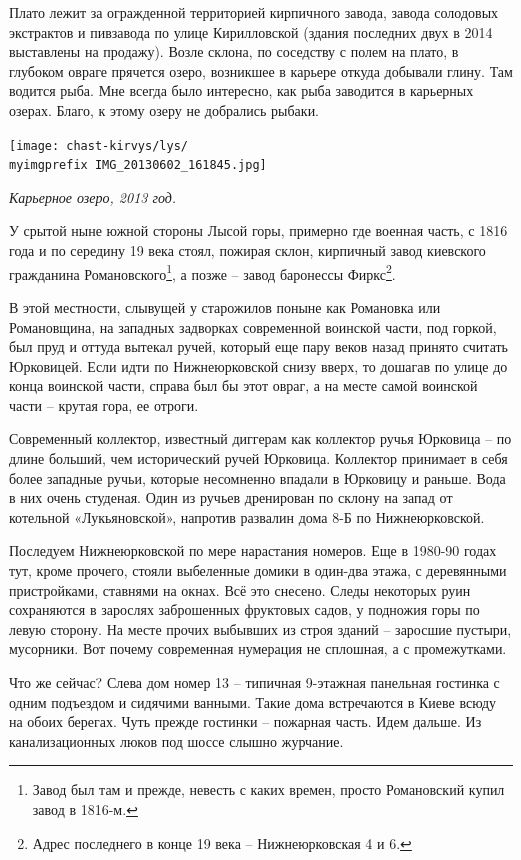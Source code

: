 Плато лежит за огражденной территорией кирпичного завода, завода солодовых экстрактов и пивзавода по улице Кирилловской (здания последних двух в 2014 выставлены на продажу). Возле склона, по соседству с полем на плато, в глубоком овраге прячется озеро, возникшее в карьере откуда добывали глину. Там водится рыба. Мне всегда было интересно, как рыба заводится в карьерных озерах. Благо, к этому озеру не добрались рыбаки.

\begin{center}
\texttt{[image: chast-kirvys/lys/\\myimgprefix IMG\_20130602\_161845.jpg]}

\textit{Карьерное озеро, 2013 год.}
\end{center} 

У срытой ныне южной стороны Лысой горы, примерно где военная часть, с 1816 года и по середину 19 века стоял, пожирая склон, кирпичный завод киевского гражданина Романовского\footnote{Завод был там и прежде, невесть с каких времен, просто Романовский купил завод в 1816-м.}, а позже – завод баронессы Фиркс\footnote{Адрес последнего в конце 19 века – Нижнеюрковская 4 и 6.}.

В этой местности, слывущей у старожилов поныне как Романовка или Романовщина, на западных задворках современной воинской части, под горкой, был пруд и оттуда вытекал ручей, который еще пару веков назад принято считать Юрковицей. Если идти по Нижнеюрковской снизу вверх, то дошагав по улице до конца воинской части, справа был бы этот овраг, а на месте самой воинской части – крутая гора, ее отроги.

Современный коллектор, известный диггерам как коллектор ручья Юрковица – по длине больший, чем исторический ручей Юрковица. Коллектор принимает в себя более западные ручьи, которые несомненно впадали в Юрковицу и раньше. Вода в них очень студеная. Один из ручьев дренирован по склону на запад от котельной «Лукьяновской», напротив развалин дома 8-Б по Нижнеюрковской.

Последуем Нижнеюрковской по мере нарастания номеров. Еще в 1980-90 годах тут, кроме прочего, стояли  выбеленные домики в один-два этажа, с деревянными пристройками, ставнями на окнах. Всё это снесено. Следы некоторых руин сохраняются в зарослях заброшенных фруктовых садов, у подножия горы по левую сторону. На месте прочих выбывших из строя зданий – заросшие пустыри, мусорники. Вот почему современная нумерация не сплошная, а с промежутками.

Что же сейчас? Слева дом номер 13 – типичная 9-этажная панельная гостинка с одним подъездом и сидячими ванными. Такие дома встречаются в Киеве всюду на обоих берегах. Чуть прежде гостинки – пожарная часть. Идем дальше. Из канализационных люков под шоссе слышно журчание.

